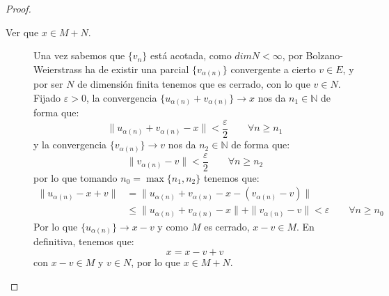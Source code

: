 \begin{ejercicio}
\begin{proof}
\begin{description}
            \item [Ver que $x\in M+N$.] Una vez sabemos que $\{v_n\}$ está acotada, como $dim N<\infty$, por Bolzano-Weierstrass ha de existir una parcial $\{v_{\alpha(n)}\}$ convergente a cierto $v\in E$, y por ser $N$ de dimensión finita tenemos que es cerrado, con lo que $v\in N$. Fijado $\varepsilon>0$, la convergencia $\{u_{\alpha(n)} + v_{\alpha(n)}\}\to x$ nos da $n_1\in \mathbb{N}$ de forma que:
                \begin{equation*}
                    \|u_{\alpha(n)} + v_{\alpha(n)} - x \| < \frac{\varepsilon}{2} \qquad \forall n\geq n_1
                \end{equation*}
                y la convergencia $\{v_{\alpha(n)}\}\to v$ nos da $n_2\in \mathbb{N}$ de forma que:
                \begin{equation*}
                    \|v_{\alpha(n)} - v\| < \frac{\varepsilon}{2}\qquad \forall n\geq n_2
                \end{equation*}
                por lo que tomando $n_0 = \max\{n_1,n_2\}$ tenemos que:
                \begin{align*}
                    \|u_{\alpha(n)} - x + v\| &= \|u_{\alpha(n)} + v_{\alpha(n)} - x - (v_{\alpha(n)} - v) \|\\ & \leq \|u_{\alpha(n)} + v_{\alpha(n)} - x\| + \|v_{\alpha(n)} - v\| < \varepsilon\qquad  \forall n\geq n_0
                \end{align*}
                Por lo que $\{u_{\alpha(n)}\}\to x-v$ y como $M$ es cerrado, $x-v\in M$. En definitiva, tenemos que:
                \begin{equation*}
                    x = x - v + v
                \end{equation*}
                con $x-v\in M$ y $v\in N$, por lo que $x\in M+N$.
        \end{description}
    \end{proof}
\end{ejercicio}
